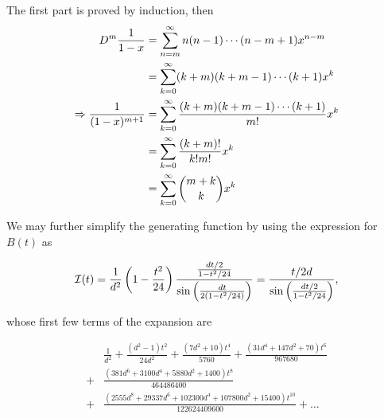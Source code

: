 \documentclass[12pt]{memoir}
\begin{document}
\begin{ptcbp}
    The first part is proved by induction, then
    \begin{align*}
        D^{m}\frac{1}{1-x}        & =\sum_{n=m}^{\infty}n(n-1)\cdots(n-m+1)x^{n-m}            \\
                                  & =\sum_{k=0}^{\infty}(k+m)(k+m-1)\cdots(k+1)x^k            \\
        \Rightarrow \frac{1}{(1-x)^{m+1}} & =\sum_{k=0}^{\infty}\frac{(k+m)(k+m-1)\cdots(k+1)}{m!}x^k \\
                                  & =\sum_{k=0}^{\infty}\frac{(k+m)!}{k!m!}x^k                \\
                                  & =\sum_{k=0}^{\infty}\binom{m+k}{k} x^k                    \\
    \end{align*}

\end{ptcbp}

We may further simplify the generating function by using the expression for \(B(t)\) as

\[
    \mathcal{I}(t)=\frac{1}{d^2}\left(1-\frac{t^2}{24}\right)\frac{\frac{dt/2}{1-t^2/24}}{\sin\left(\frac{dt}{2(1-t^2/24)}\right)}=\frac{t/2d}{\sin\left(\frac{dt/2}{1-t^2/24}\right)},
\]

whose first few terms of the expansion are

\begin{align*}
      & \frac{1}{d^{2}} + \frac{(d^{2} - 1) t^{2}}{24 d^{2}} + \frac{(7 d^{2} + 10) t^{4}}{5760} + \frac{(31 d^{4} + 147 d^{2} + 70) t^{6}}{967680} \\
    + & \frac{(381 d^{6} + 3100 d^{4} + 5880 d^{2} + 1400) t^{8}}{464486400}                                                                        \\
    + & \frac{(2555 d^{8} + 29337 d^{6} + 102300 d^{4} + 107800 d^{2} + 15400) t^{10}}{122624409600}+\dots
\end{align*}
\end{document}
